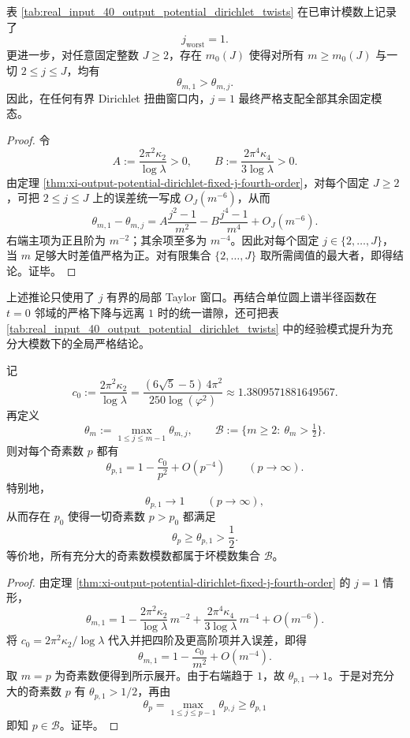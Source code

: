 \begin{corollary}[有界单位根窗口内的最坏模态最终由 \texorpdfstring{$j=1$}{j=1} 实现]\label{cor:xi-output-potential-dirichlet-bounded-window-j1}
表 \ref{tab:real_input_40_output_potential_dirichlet_twists} 在已审计模数上记录了
\[
j_{\mathrm{worst}}=1.
\]
更进一步，对任意固定整数 \(J\ge 2\)，存在 \(m_0(J)\) 使得对所有 \(m\ge m_0(J)\) 与一切 \(2\le j\le J\)，均有
\[
\theta_{m,1}>\theta_{m,j}.
\]
因此，在任何有界 Dirichlet 扭曲窗口内，\(j=1\) 最终严格支配全部其余固定模态。
\end{corollary}
\begin{proof}
令
\[
A:=\frac{2\pi^2\kappa_2}{\log\lambda}>0,
\qquad
B:=\frac{2\pi^4\kappa_4}{3\log\lambda}>0.
\]
由定理 \ref{thm:xi-output-potential-dirichlet-fixed-j-fourth-order}，对每个固定 \(J\ge 2\)，可把 \(2\le j\le J\) 上的误差统一写成 \(O_J(m^{-6})\)，从而
\[
\theta_{m,1}-\theta_{m,j}
=
A\frac{j^2-1}{m^2}
-B\frac{j^4-1}{m^4}
+O_J(m^{-6}).
\]
右端主项为正且阶为 \(m^{-2}\)；其余项至多为 \(m^{-4}\)。因此对每个固定 \(j\in\{2,\dots,J\}\)，当 \(m\) 足够大时差值严格为正。对有限集合 \(\{2,\dots,J\}\) 取所需阈值的最大者，即得结论。证毕。
\end{proof}

\noindent 上述推论只使用了 \(j\) 有界的局部 Taylor 窗口。再结合单位圆上谱半径函数在 \(t=0\) 邻域的严格下降与远离 \(1\) 时的统一谱隙，还可把表 \ref{tab:real_input_40_output_potential_dirichlet_twists} 中的经验模式提升为充分大模数下的全局严格结论。



\begin{theorem}[充分大奇素数模数的平方根门槛必然失效]\label{thm:xi-output-potential-large-odd-primes-bad}
记
\[
c_0:=\frac{2\pi^2\kappa_2}{\log\lambda}
=\frac{(6\sqrt5-5)\,4\pi^2}{250\log(\varphi^2)}
\approx 1.3809571881649567.
\]
再定义
\[
\theta_m:=\max_{1\le j\le m-1}\theta_{m,j},
\qquad
\mathcal B:=\{m\ge 2:\ \theta_m>\tfrac12\}.
\]
则对每个奇素数 \(p\) 都有
\[
\theta_{p,1}
=
1-\frac{c_0}{p^2}+O(p^{-4})
\qquad(p\to\infty).
\]
特别地，
\[
\theta_{p,1}\longrightarrow 1
\qquad(p\to\infty),
\]
从而存在 \(p_0\) 使得一切奇素数 \(p>p_0\) 都满足
\[
\theta_p\ge \theta_{p,1}>\frac12.
\]
等价地，所有充分大的奇素数模数都属于坏模数集合 \(\mathcal B\)。
\end{theorem}
\begin{proof}
由定理 \ref{thm:xi-output-potential-dirichlet-fixed-j-fourth-order} 的 \(j=1\) 情形，
\[
\theta_{m,1}
=
1-\frac{2\pi^2\kappa_2}{\log\lambda}\,m^{-2}
+\frac{2\pi^4\kappa_4}{3\log\lambda}\,m^{-4}
+O(m^{-6}).
\]
将
\(
c_0=2\pi^2\kappa_2/\log\lambda
\)
代入并把四阶及更高阶项并入误差，即得
\[
\theta_{m,1}=1-\frac{c_0}{m^2}+O(m^{-4}).
\]
取 \(m=p\) 为奇素数便得到所示展开。由于右端趋于 \(1\)，故 \(\theta_{p,1}\to 1\)。于是对充分大的奇素数 \(p\) 有 \(\theta_{p,1}>1/2\)，再由
\[
\theta_p=\max_{1\le j\le p-1}\theta_{p,j}\ge \theta_{p,1}
\]
即知 \(p\in\mathcal B\)。证毕。
\end{proof}

